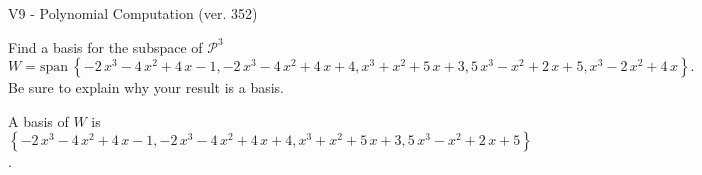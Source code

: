 \begin{exercise}
  \begin{exerciseTitle}V9 - Polynomial Computation (ver. 352)\end{exerciseTitle}
  \begin{exerciseStatement}
    Find a basis for the subspace of \(\mathcal{P}^3\) 
\[W=\mathrm{span}\ \left\{-2 \, x^{3} - 4 \, x^{2} + 4 \, x - 1 , -2 \, x^{3} - 4 \, x^{2} + 4 \, x + 4 , x^{3} + x^{2} + 5 \, x + 3 , 5 \, x^{3} - x^{2} + 2 \, x + 5 , x^{3} - 2 \, x^{2} + 4 \, x\right\}.\]
 Be sure to explain why your result is a basis.


  \end{exerciseStatement}
  \begin{exerciseAnswer}
   A basis of \(W\) is  \(\left\{-2 \, x^{3} - 4 \, x^{2} + 4 \, x - 1 , -2 \, x^{3} - 4 \, x^{2} + 4 \, x + 4 , x^{3} + x^{2} + 5 \, x + 3 , 5 \, x^{3} - x^{2} + 2 \, x + 5\right\}\).
  


  \end{exerciseAnswer}
\end{exercise}